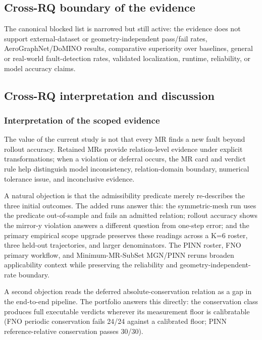 \documentclass[preprint,12pt]{elsarticle}
\begin{document}
\subsection{Cross-RQ boundary of the evidence}
\label{subsec:still-blocked}

The canonical blocked list is narrowed but still active: the evidence does not support external-dataset or geometry-independent pass/fail rates, AeroGraphNet/DoMINO results, comparative superiority over baselines, general or real-world fault-detection rates, validated localization, runtime, reliability, or model accuracy claims.

\subsection{Cross-RQ interpretation and discussion}
\label{sec:discussion}

\subsubsection{Interpretation of the scoped evidence}
\label{subsec:scoped-interpretation}

The value of the current study is not that every MR finds a new fault beyond rollout accuracy. Retained MRs provide relation-level evidence under explicit transformations; when a violation or deferral occurs, the MR card and verdict rule help distinguish model inconsistency, relation-domain boundary, numerical tolerance issue, and inconclusive evidence.

A natural objection is that the admissibility predicate merely re-describes the three initial outcomes. The added runs answer this: the symmetric-mesh run uses the predicate out-of-sample and fails an admitted relation; rollout accuracy shows the mirror-y violation answers a different question from one-step error; and the primary empirical scope upgrade preserves these readings across a K=6 roster, three held-out trajectories, and larger denominators. The PINN roster, FNO primary workflow, and Minimum-MR-SubSet MGN/PINN reruns broaden applicability context while preserving the reliability and geometry-independent-rate boundary.

A second objection reads the deferred absolute-conservation relation as a gap in the end-to-end pipeline. The portfolio answers this directly: the conservation class produces full executable verdicts wherever its measurement floor is calibratable (FNO periodic conservation fails 24/24 against a calibrated floor; PINN reference-relative conservation passes 30/30).
\end{document}
